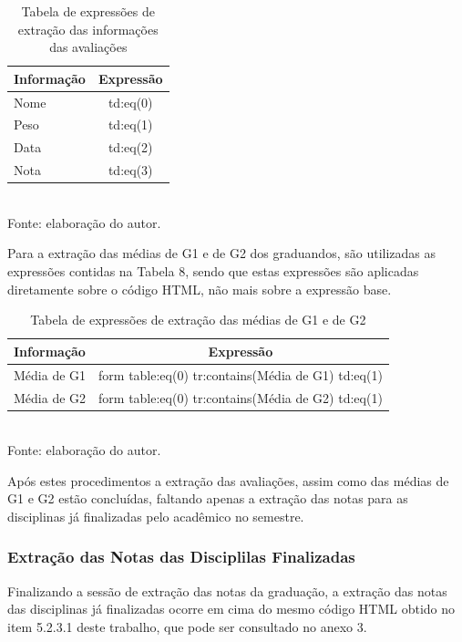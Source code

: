 \begin{table}[!hbt]
\centering
\caption[Extração de Informações - Expressões de Extração]{Tabela de expressões de extração das informações das avaliações}
\vspace{3mm}
\begin{tabular}{p{3cm}|c}\hline
\bf{Informação} & \bf{Expressão} \\ \hline
Nome & td:eq(0)\\ \hline
Peso & td:eq(1)\\ \hline
Data & td:eq(2)\\ \hline
Nota & td:eq(3)\\ \hline
\end{tabular}
\\ Fonte: elaboração do autor.
\end{table}

Para a extração das médias de G1 e de G2 dos graduandos, são utilizadas as expressões contidas na Tabela 8, sendo que estas expressões são aplicadas diretamente sobre o código HTML, não mais sobre a expressão base.

\begin{table}[!hbt]
\centering
\caption[Extração de Informações - Extração das Médias]{Tabela de expressões de extração das médias de G1 e de G2}
\vspace{3mm}
\begin{tabular}{p{3cm}|c}\hline
\bf{Informação} & \bf{Expressão} \\ \hline
Média de G1 & form table:eq(0) tr:contains(Média de G1) td:eq(1)\\ \hline
Média de G2 & form table:eq(0) tr:contains(Média de G2) td:eq(1)\\ \hline
\end{tabular}
\\ Fonte: elaboração do autor.
\end{table}

Após estes procedimentos a extração das avaliações, assim como das médias de G1 e G2 estão concluídas, faltando apenas a extração das notas para as disciplinas já finalizadas pelo acadêmico no semestre.

\subsubsection{Extração das Notas das Disciplilas Finalizadas}
Finalizando a sessão de extração das notas da graduação, a extração das notas das disciplinas já finalizadas ocorre em cima do mesmo código HTML obtido no item 5.2.3.1 deste trabalho, que pode ser consultado no anexo 3.

